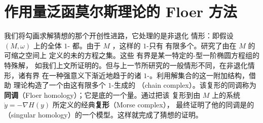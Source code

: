 
\section{作用量泛函莫尔斯理论的 Floer 方法}
\label{sec:floer-morse}

%
%
%

我们将勾画\trFloer{}求解\trArnold{}猜想的那个开创性进路，它处理的是非退化%
情形：即假设 $(M,\omega)$ 上\trHamiltonianSystem{}的全体 $1$-\trPeriodicSolution%
都\trNondegenerate。由于 $M$ \trCompact，这样的 $1$-\trPeriodicSolution{}只有%
有限多个。\trFloer{}研究了由\trActionFunctional{}在 $M$ 的可缩\trLoop{}之空间上%
定义的未\trRegularization{}的\trGradient{}方程之\trBounded\trOrbit{}集。这些%
有界\trOrbit{}是某一特定的\trCauchy-\trRiemann{}型一阶椭圆方程组的特殊解，%
如我们上文所证明的。但与上一节所研究的一般情形不同，在非退化情形，诸有界%
\trOrbit{}在一种强意义下渐近地趋于\trHamiltonianEquation{}的诸%
$1$-\trPeriodicSolution。\trFloer{}利用解集合的这一附加结构，借助\trFredholm{}%
理论构造了一个由这有限多个 $1$-\trPeriodicSolution{}生成的%
\textbf{\trChainComplex}（chain complex）。该复形的同调称为\textbf{\trFloer{}%
同调}（Floer homology）；它是底\trManifold{}的一个\trInvariant{}量。通过把该%
复形\trContinuation{}到由 $M$ 上\trHamiltonianFunction{}的\trGradient{}系统%
$\dot{y}=-\nabla H(y)$ 所定义的经典\textbf{\trMorse{}复形}（Morse complex），%
\trFloer{}最终证明了他的同调是\trManifold{}的\textbf{\trSingularHomology}%
（singular homology）的一个模型。这样就完成了\trArnold{}猜想的证明。

